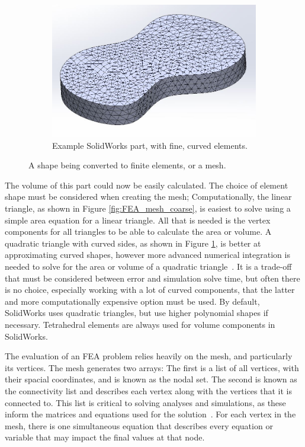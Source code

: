 \begin{figure}
\begin{subfigure}[h]{0.6\textwidth}
        \includegraphics[width=\textwidth]{chap3_images/mesh_test_part_fine_mesh.JPG}
        \caption{Example SolidWorks part, with fine, curved elements.}
        \label{fig:FEA_mesh_fine}
    \end{subfigure}
    \caption{A shape being converted to finite elements, or a mesh.}
    \label{FEA_mesh_example}
\end{figure}

The volume of this part could now be easily calculated. The choice of element shape must be considered when creating the mesh; Computationally, the linear triangle, as shown in Figure \ref{fig:FEA_mesh_coarse}, is easiest to solve using a simple area equation for a linear triangle. All that is needed is the vertex components for all triangles to be able to calculate the area or volume. A quadratic triangle with curved sides, as shown in Figure \ref{fig:FEA_mesh_fine}, is better at approximating curved shapes, however more advanced numerical integration is needed to solve for the area or volume of a quadratic triangle~\citep{FEA_SW}. It is a trade-off that must be considered between error and simulation solve time, but often there is no choice, especially working with a lot of curved components, that the latter and more computationally expensive option must be used. By default, SolidWorks uses quadratic triangles, but use higher polynomial shapes if necessary. Tetrahedral elements are always used for volume components in SolidWorks. 

The evaluation of an FEA problem relies heavily on the mesh, and particularly its vertices. The mesh generates two arrays: The first is a list of all vertices, with their spacial coordinates, and is known as the nodal set. The second is known as the connectivity list and describes each vertex along with the vertices that it is connected to. This list is critical to solving analyses and simulations, as these inform the matrices and equations used for the solution~\citep{FEA_SW}. For each vertex in the mesh, there is one simultaneous equation that describes every equation or variable that may impact the final values at that node. 

